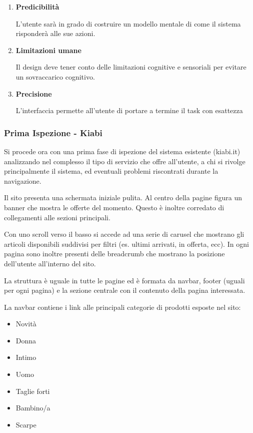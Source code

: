 \documentclass[12pt,italian,]{report}
\begin{document}
\begin{enumerate}
\def\labelenumi{\arabic{enumi}.}
\setcounter{enumi}{10}
\item
    \textbf{Predicibilità}

L'utente sarà in grado di costruire un modello mentale di come il
sistema risponderà alle sue azioni.

\def\labelenumi{\arabic{enumi}.}
\setcounter{enumi}{11}
\item
  \textbf{Limitazioni umane}

Il design deve tener conto delle limitazioni cognitive e sensoriali per
evitare un sovraccarico cognitivo.

\def\labelenumi{\arabic{enumi}.}
\setcounter{enumi}{12}
\item
  \textbf{Precisione}

L'interfaccia permette all'utente di portare a termine il task con
esattezza
\end{enumerate}


\subsubsection{Prima Ispezione - Kiabi}\label{prima-ispezione}
Si procede ora con una prima fase di ispezione del sistema esistente (kiabi.it) analizzando nel complesso il tipo di servizio che offre all’utente, a chi si rivolge principalmente il sistema, ed eventuali problemi riscontrati durante la navigazione.

Il sito presenta una schermata iniziale pulita. Al centro della pagine figura un banner che mostra le offerte del momento. Questo è inoltre corredato di collegamenti alle sezioni principali. 

Con uno scroll verso il basso si accede ad una serie di carusel che mostrano gli articoli disponibili suddivisi per filtri (es. ultimi arrivati, in offerta, ecc).
In ogni pagina sono inoltre presenti delle breadcrumb che mostrano la posizione dell'utente all'interno del sito.

La struttura è uguale in tutte le pagine ed è formata da navbar, footer (uguali per ogni pagina) e la sezione centrale con il contenuto della pagina interessata.

La navbar contiene i link alle principali categorie di prodotti esposte nel sito:

\begin{itemize}
\item Novità
\item Donna
\item Intimo
\item Uomo
\item Taglie forti
\item Bambino/a
\item Scarpe
\end{itemize}
\end{document}

